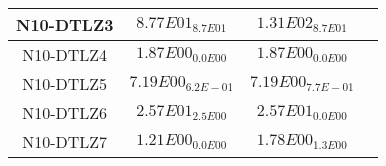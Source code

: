 \documentclass{article}
\begin{document}
\begin{table*}[ht!]
\begin{tabular}{|c||c||c||c|}
\hline
N10-DTLZ3 &\cellcolor{gray95}$8.77E01_{8.7E01}$ &\cellcolor{gray25}$1.31E02_{8.7E01}$\\ 
\hline
N10-DTLZ4 &\cellcolor{gray95}$1.87E00_{0.0E00}$ &\cellcolor{gray25}$1.87E00_{0.0E00}$\\ 
\hline
N10-DTLZ5 &\cellcolor{gray95}$7.19E00_{6.2E-01}$ &\cellcolor{gray25}$7.19E00_{7.7E-01}$\\ 
\hline
N10-DTLZ6 &\cellcolor{gray25}$2.57E01_{2.5E00}$ &\cellcolor{gray95}$2.57E01_{0.0E00}$\\ 
\hline
N10-DTLZ7 &\cellcolor{gray95}$1.21E00_{0.0E00}$ &\cellcolor{gray25}$1.78E00_{1.3E00}$\\ 
\hline
\end{tabular}
\end{table*}
\end{document}
